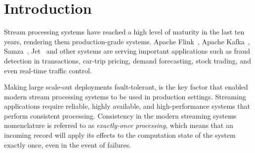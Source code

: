 \documentclass[sigconf]{acmart}
\begin{document}





\maketitle


\section{Introduction}

Stream processing systems have reached a high level of maturity in the last ten years, rendering them production-grade systems.
Apache Flink~\cite{CarboneKE15}, Apache Kafka~\cite{Wang15Building}, Samza~\cite{NoghabiPP17}, Jet~\cite{gencer2021hazelcast} and other systems are serving important applications such as fraud detection in transactions, car-trip pricing, demand forecasting, stock trading, and even real-time traffic control.


Making large scale-out deployments fault-tolerant, is the key factor that enabled modern stream processing systems to be used in production settings. Streaming applications require reliable, highly available, and high-performance systems that perform consistent processing. Consistency in the modern streaming systems nomenclature is referred to as \textit{exactly-once processing}, which means that an incoming record will apply its effects to the computation state of the system exactly once, even in the event of failures. 

\end{document}
